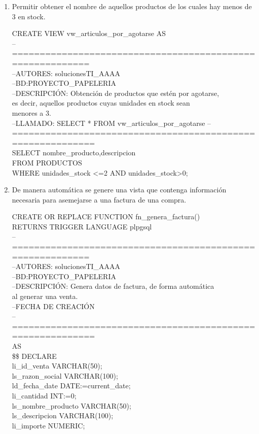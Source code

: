 \documentclass[10pt]{report}
\begin{document}
\begin{enumerate}
\begin{flushleft}
    \end{flushleft}
    
    \item   Permitir obtener el nombre de aquellos productos de los cuales hay menos de 3 en stock.
    
    \begin{flushleft} \ttfamily
    CREATE VIEW vw\_articulos\_por\_agotarse
    AS\\
    --==========================================================\\
    --AUTORES: solucionesTI\_AAAA\\
    --BD:PROYECTO\_PAPELERIA\\
    --DESCRIPCIÓN: Obtención de productos que estén por agotarse,\\
    es decir, aquellos productos cuyas unidades en stock sean\\ menores a 3.\\
    --LLAMADO: SELECT * FROM vw\_articulos\_por\_agotarse
    --===========================================================\\
	SELECT nombre\_producto,descripcion\\ 
	FROM PRODUCTOS\\
	WHERE unidades\_stock <=2 AND unidades\_stock>0;\\
    \end{flushleft}
    
    \item De manera automática se genere una vista que contenga información necesaria para asemejarse a una factura de una compra.
    
    \begin{flushleft} \ttfamily
    CREATE OR REPLACE FUNCTION fn\_genera\_factura()\\
    RETURNS TRIGGER LANGUAGE plpgsql\\
    --==========================================================\\
    --AUTORES: solucionesTI\_AAAA\\
    --BD:PROYECTO\_PAPELERIA\\
    --DESCRIPCIÓN: Genera datos de factura, de forma automática \\
    al generar una venta.\\
    --FECHA DE CREACIÓN \\
    --===========================================================\\
    AS\\
    \$\$
    DECLARE\\ 
        li\_id\_venta 		VARCHAR(50);\\
		ls\_razon\_social 	VARCHAR(100);\\
		ld\_fecha\_date		DATE:=current\_date;\\
		li\_cantidad			INT:=0;\\
		ls\_nombre\_producto  VARCHAR(50);\\
		ls\_descripcion		VARCHAR(100);\\
		li\_importe			NUMERIC;\\
    

\end{flushleft}
\end{enumerate}
\end{document}
